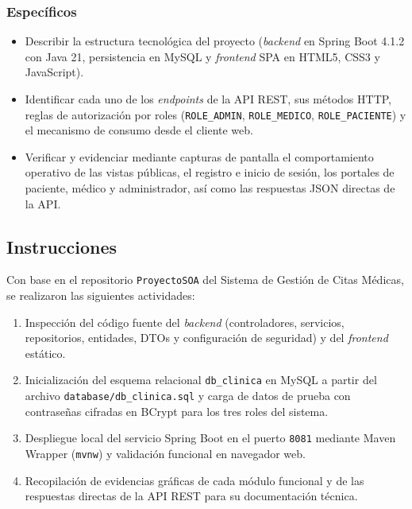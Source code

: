 \documentclass{article}
\begin{document}
\subsubsection{Específicos}
\begin{itemize}
    \item Describir la estructura tecnológica del proyecto (\textit{backend} en Spring Boot 4.1.2 con Java 21, persistencia en MySQL y \textit{frontend} SPA en HTML5, CSS3 y JavaScript).
    \item Identificar cada uno de los \textit{endpoints} de la API REST, sus métodos HTTP, reglas de autorización por roles (\texttt{ROLE\_ADMIN}, \texttt{ROLE\_MEDICO}, \texttt{ROLE\_PACIENTE}) y el mecanismo de consumo desde el cliente web.
    \item Verificar y evidenciar mediante capturas de pantalla el comportamiento operativo de las vistas públicas, el registro e inicio de sesión, los portales de paciente, médico y administrador, así como las respuestas JSON directas de la API.
\end{itemize}


\subsection{Instrucciones}
Con base en el repositorio \texttt{ProyectoSOA} del Sistema de Gestión de Citas Médicas, se realizaron las siguientes actividades:
\begin{enumerate}
    \item Inspección del código fuente del \textit{backend} (controladores, servicios, repositorios, entidades, DTOs y configuración de seguridad) y del \textit{frontend} estático.
    \item Inicialización del esquema relacional \texttt{db\_clinica} en MySQL a partir del archivo \texttt{database/db\_clinica.sql} y carga de datos de prueba con contraseñas cifradas en BCrypt para los tres roles del sistema.
    \item Despliegue local del servicio Spring Boot en el puerto \texttt{8081} mediante Maven Wrapper (\texttt{mvnw}) y validación funcional en navegador web.
    \item Recopilación de evidencias gráficas de cada módulo funcional y de las respuestas directas de la API REST para su documentación técnica.
\end{enumerate}
\end{document}
